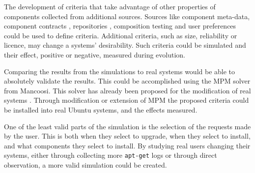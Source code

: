 The development of criteria that take advantage of other properties of components collected from additional sources.
Sources like component meta-data, component contracts \citep{Watkins1999}, repositories \citep{Guo2000}, 
composition testing \citep{XuejieZhang2008} and user preferences could be used to define criteria.
Additional criteria, such as size, reliability or licence, may change a systems' desirability.
Such criteria could be simulated and their effect, positive or negative, measured during evolution.

Comparing the results from the simulations to real systems would be able to absolutely validate the results.
This could be accomplished using the MPM solver from Mancoosi.
This solver has already been proposed for the modification of real systems \citep{abate2011}.
Through modification or extension of MPM the proposed criteria could be installed into real Ubuntu systems, and the effects measured.  

One of the least valid parts of the simulation is the selection of the requests made by the user.
This is both when they select to upgrade, when they select to install, and what components they select to install.
By studying real users changing their systems, either through collecting more \texttt{apt-get} logs or through direct observation,
a more valid simulation could be created.
 
